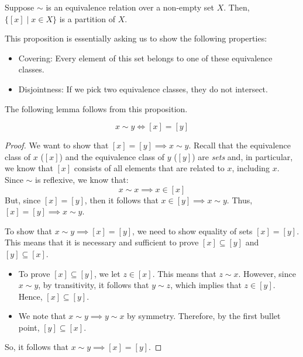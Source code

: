 \documentclass[letterpaper]{article}
\begin{document}
\begin{proposition}
    Suppose $\sim$ is an equivalence relation over a non-empty set $X$. Then, $\{[x] \mid x \in X\}$ is a partition of $X$. 
\end{proposition}
This proposition is essentially asking us to show the following properties: 
\begin{itemize}
    \item Covering: Every element of this set belongs to one of these equivalence classes. 
    \item Disjointness: If we pick two equivalence classes, they do not intersect.
\end{itemize}
The following lemma follows from this proposition.
\begin{lemma}{}{}
    \[x \sim y \iff [x] = [y]\]
\end{lemma}
\begin{mdframed}
    \begin{proof}
        We want to show that $[x] = [y] \implies x \sim y$. Recall that the equivalence class of $x$ ($[x]$) and the equivalence class of $y$ ($[y]$) are \emph{sets} and, in particular, we know that $[x]$ consists of all elements that are related to $x$, including $x$. Since $\sim$ is reflexive, we know that:
        \[x \sim x \implies x \in [x]\]
        But, since $[x] = [y]$, then it follows that $x \in [y] \implies x \sim y$. Thus, $[x] = [y] \implies x \sim y$. 
        
        \bigskip 
    
        To show that $x \sim y \implies [x] = [y]$, we need to show equality of sets $[x] = [y]$. This means that it is necessary and sufficient to prove $[x] \subseteq [y]$ and $[y] \subseteq [x]$.
        \begin{itemize}
            \item To prove $[x] \subseteq [y]$, we let $z \in [x]$. This means that $z \sim x$. However, since $x \sim y$, by transitivity, it follows that $y \sim z$, which implies that $z \in [y]$. Hence, $[x] \subseteq [y]$. 
            \item We note that $x \sim y \implies y \sim x$ by symmetry. Therefore, by the first bullet point, $[y] \subseteq [x]$.
        \end{itemize} 
        So, it follows that $x \sim y \implies [x] = [y]$. 
    \end{proof}
\end{mdframed}
\end{document}

